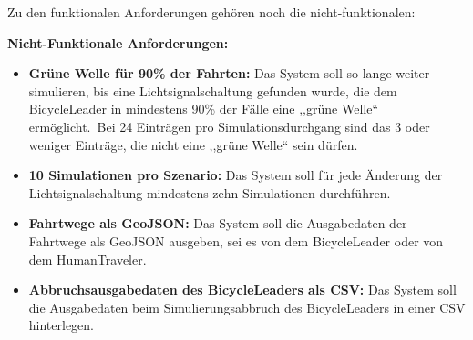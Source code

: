 Zu den funktionalen Anforderungen gehören noch die nicht-funktionalen:

\textbf{Nicht-Funktionale Anforderungen:}

\begin{itemize}
    \item \textbf{Grüne Welle für 90\% der Fahrten:} Das System soll so lange weiter simulieren, bis eine Lichtsignalschaltung gefunden wurde, die dem BicycleLeader in mindestens 90\% der Fälle eine ,,grüne Welle`` ermöglicht.~Bei 24 Einträgen pro Simulationsdurchgang sind das 3 oder weniger Einträge, die nicht eine ,,grüne Welle`` sein dürfen.
    \item \textbf{10 Simulationen pro Szenario:} Das System soll für jede Änderung der Lichtsignalschaltung mindestens zehn Simulationen durchführen.
    \item \textbf{Fahrtwege als GeoJSON:} Das System soll die Ausgabedaten der Fahrtwege als GeoJSON ausgeben, sei es von dem BicycleLeader oder von dem HumanTraveler.
    \item \textbf{Abbruchsausgabedaten des BicycleLeaders als CSV:} Das System soll die Ausgabedaten beim Simulierungsabbruch des BicycleLeaders in einer CSV hinterlegen.
\end{itemize}
